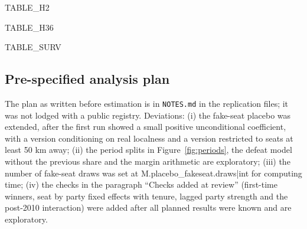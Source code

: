 \documentclass[11pt,a4paper]{article}
\begin{document}
{{TABLE_H2}}

{{TABLE_H36}}

{{TABLE_SURV}}

\subsection{Pre-specified analysis plan}
The plan as written before estimation is in \texttt{NOTES.md} in the replication files; it was not lodged with a public registry. Deviations: (i) the fake-seat placebo was extended, after the first run showed a small positive unconditional coefficient, with a version conditioning on real localness and a version restricted to seats at least 50 km away; (ii) the period splits in Figure~\ref{fig:periods}, the defeat model without the previous share and the margin arithmetic are exploratory; (iii) the number of fake-seat draws was set at {{M.placebo_fakeseat.draws|int}} for computing time; (iv) the checks in the paragraph ``Checks added at review'' (first-time winners, seat by party fixed effects with tenure, lagged party strength and the post-2010 interaction) were added after all planned results were known and are exploratory.
\end{document}

